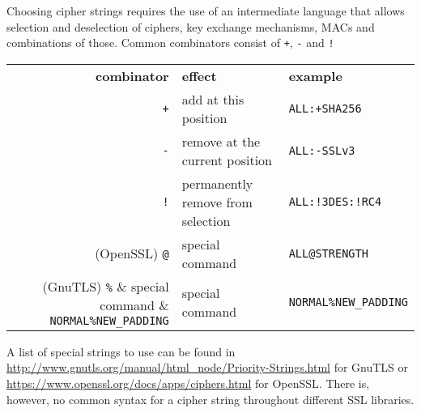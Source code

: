 Choosing cipher strings requires the use of an intermediate language that allows selection
and deselection of ciphers, key exchange mechanisms, MACs and combinations of those.
Common combinators consist of \texttt{+}, \texttt{-} and \texttt{!}

\begin{center}
\begin{tabular}{rll}
\toprule
\textbf{combinator} & \textbf{effect}                   & \textbf{example}\\\cmidrule(lr){1-3}
           \verb|+| & add at this position              & \verb|ALL:+SHA256|        \\
           \verb|-| & remove at the current position    & \verb|ALL:-SSLv3|         \\
           \verb|!| & permanently remove from selection & \verb|ALL:!3DES:!RC4|     \\
 (OpenSSL) \verb|@| & special command                   & \verb|ALL@STRENGTH|       \\
  (GnuTLS) \verb|%| & special command                   & \verb|NORMAL%NEW_PADDING| \\
\bottomrule
\end{tabular}
\end{center}

A list of special strings to use can be found in
\url{http://www.gnutls.org/manual/html_node/Priority-Strings.html} for GnuTLS or
\url{https://www.openssl.org/docs/apps/ciphers.html} for OpenSSL. There is, however, no
common syntax for a cipher string throughout different SSL libraries.

%
%
%
%
%
%
%
%
%

